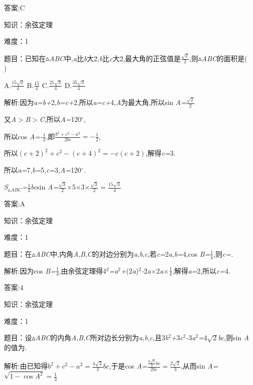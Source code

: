 \documentclass{article} %
\begin{document}
 答案:C

知识：余弦定理

难度：1

 题目：已知在$\mathrm{\vartriangle}$\textit{ABC}中,\textit{a}比\textit{b}大2,\textit{b}比\textit{c}大2,最大角的正弦值是$\frac{\sqrt{2}}{2}$,则$\mathrm{\vartriangle}$\textit{ABC}的面积是(\textit{　　})

 A.$\frac{15\sqrt{3}}{4}$ B.$\frac{15}{4}$ C.$\frac{21\sqrt{3}}{4}$ D.$\frac{35\sqrt{3}}{4}$

 解析:因为\textit{a=b+}2,\textit{b=c+}2,所以\textit{a=c+}4,\textit{A}为最大角,所以sin \textit{A=}$\frac{\sqrt{2}}{2}$

又\textit{A$>$B$>$C},所以\textit{A=}120$\mathrm{{}^\circ}$,

所以cos \textit{A=-}$\frac{1}{2}$,即$\frac{b^2+c^2-a^2}{2bc}=-\frac{1}{2}$,

所以${(c+2)}^2+c^2-{(c+4)}^2=-c(c+2)$,解得\textit{c=}3\textit{.}

所以\textit{a=}7,\textit{b=}5,\textit{c=}3,\textit{A=}120$\mathrm{{}^\circ}$\textit{.}

\textit{S}${}_{\vartriangle }$\textit{${}_{ABC}$=}$\frac{1}{2}$\textit{bc}sin \textit{A=}$\frac{\sqrt{3}}{2}$\textit{$\times$}5\textit{$\times$}3\textit{$\times$}$\frac{\sqrt{3}}{2}=\frac{15\sqrt{3}}{4}$

 答案:A

知识：余弦定理

难度：1

 题目：在$\mathrm{\vartriangle}$\textit{ABC}中,内角\textit{A},\textit{B},\textit{C}的对边分别为\textit{a},\textit{b},\textit{c},若\textit{c=}2\textit{a},\textit{b=}4,cos \textit{B=}$\frac{1}{4}$,则\textit{c=\underbar{　　　　　}.~}

 解析:因为cos \textit{B=}$\frac{1}{4}$,由余弦定理得4${}^{2}$\textit{=a}${}^{2}$\textit{+}(2\textit{a})${}^{2}$\textit{-}2\textit{a$\times$}2\textit{a$\times$}$\frac{1}{4}$,解得\textit{a=}2,所以\textit{c=}4\textit{.}

 答案:4

知识：余弦定理

难度：1

 题目：设$\mathrm{\vartriangle}$\textit{ABC}的内角\textit{A},\textit{B},\textit{C}所对边长分别为\textit{a},\textit{b},\textit{c},且3\textit{b}${}^{2}$\textit{+}3\textit{c}${}^{2}$\textit{-}3\textit{a}${}^{2}$\textit{=}4$\sqrt{2}$\textit{bc},则sin \textit{A}的值为\textit{\underbar{　　　　　}.~}

 解析:由已知得$b^2+c^2-a^2=\frac{4\sqrt{2}}{3}bc$,于是cos \textit{A=}$\frac{\frac{4\sqrt{2}}{3}bc}{2bc}=\frac{2\sqrt{2}}{3}$,从而sin \textit{A=}$\sqrt{1-{\cos A}^2}=\frac{1}{3}$
\end{document}
